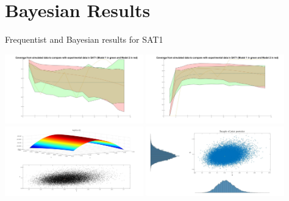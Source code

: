 \documentclass[10pt]{beamer}
\theoremstyle{plain}
\theoremstyle{definition}
\theoremstyle{remark}
\begin{document}
\section{Bayesian Results}
\begin{frame}{Frequentist and Bayesian results for SAT1}
\begin{center}
\includegraphics[height=0.4\textheight,width=0.45\textwidth]{fig11.jpg}
\includegraphics[height=0.4\textheight,width=0.45\textwidth]{fig14.jpg}
\includegraphics[height=0.4\textheight,width=0.45\textwidth]{mcmchcfig2.jpg}
\includegraphics[height=0.4\textheight,width=0.45\textwidth]{mcmchcfig4.jpg}
\end{center}
\end{frame}
\end{document}
